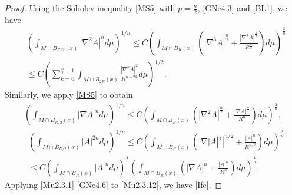 \documentclass{amsart}
\theoremstyle{definition}
\numberwithin{equation}{section}
\begin{document}
\begin{proof}
Using the Sobolev inequality \eqref{MS5} with $p=\frac n 2$,  \eqref{GNe4.3}  and \eqref{BL1}, we have
\begin{align}\label{BL3}
&\left (\int_{M \cap B_{R/2}(x)}   |\nabla^2 A|^{n} d\mu \right )^{1/n}
\leq C\left ( \int_{M \cap B_{R}(x)}\left (|\nabla^3   A|^{\frac n 2} +\frac {|\nabla^2 A|^{\frac n 2}}{R^{\frac n 2}}\right ) d\mu\right )^{\frac 2 n}\\
 &\leq C\left (\sum_{k=0}^{\frac n 2 +1} \int_{M \cap B_{2R}(x)}
\frac { |\nabla^{k}  A|^2 }{R^{ n-2k}} d\mu\right )^{1/2}.\nonumber
\end{align}
Similarly,   we apply \eqref{MS5} to obtain
\begin{align}\label{GNe4.6}
\left (\int_{M\cap  B_{R/2}(x)}  |\nabla A|^{n }  d\mu\right )^{1/n}\leq C\left ( \int_{ M\cap B_{R}(x)}\left (
 |\nabla^2   A|^{\frac n 2} +\frac {|\nabla A|^{\frac n 2}}{R^n }\right ) d\mu\right )^{\frac 2 n},
\end{align}
\begin{align}\label{GNe4.6}
&\left (\int_{ M\cap B_{R/2}(x)}  |A|^{2n }  d\mu\right )^{1/n}\leq C\left ( \int_{M\cap  B_{R}(x)}\left (
 |\nabla   |A|^2|^{n/2} +\frac {|A|^{n}}{R^{n/2} }\right ) d\mu\right )^{\frac 2 n}\\
 &\leq C \left ( \int_{M\cap  B_{R}(x)}  |A|^{n}   d\mu\right )^{\frac 1 n}\left ( \int_{M\cap B_{R}(x)}\left (
 |\nabla   A|^{n} +\frac {|A|^{n}}{R^{n} }\right ) d\mu\right )^{\frac 1 n}\nonumber .
\end{align}
Applying \eqref{Mu2.3.1}-\eqref{GNe4.6}   to \eqref{Mu2.3.12},  we have \eqref{Ife}.
\end{proof}
\end{document}
